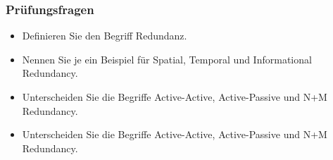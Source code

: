 \subsubsection*{Prüfungsfragen}

\begin{itemize}
	\item Definieren Sie den Begriff Redundanz.
	\item Nennen Sie je ein Beispiel für Spatial, Temporal und Informational Redundancy.
	\item Unterscheiden Sie die Begriffe Active-Active, Active-Passive und N+M Redundancy.
\end{itemize}

\begin{itemize}
	\item Unterscheiden Sie die Begriffe Active-Active, Active-Passive und N+M Redundancy.
\end{itemize}

